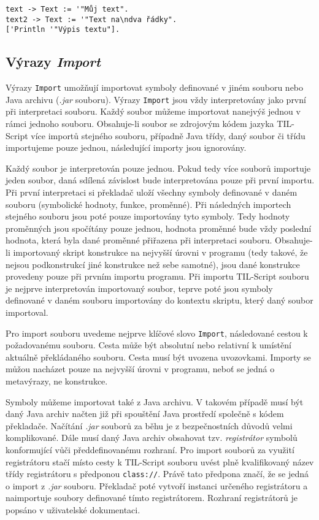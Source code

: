 \begin{lstlisting}[caption={Příklad využití typu Text}]
text -> Text := '"Můj text".
text2 -> Text := '"Text na\ndva řádky".
['Println '"Výpis textu"].
\end{lstlisting}

\subsection{Výrazy \textit{Import}}\label{import-statement}

Výrazy \lstinline{Import} umožňují importovat symboly definované v jiném souboru nebo Java archivu
(\textit{.jar} souboru). Výrazy \lstinline{Import} jsou vždy interpretovány jako první při
interpretaci souboru. Každý soubor můžeme importovat nanejvýš jednou v rámci jednoho souboru.
Obsahuje-li soubor se zdrojovým kódem jazyka TIL-Script více importů stejného souboru, případně Java
třídy, daný soubor či třídu importujeme pouze jednou, následující importy jsou ignorovány.

Každý soubor je interpretován pouze jednou. Pokud tedy více souborů importuje jeden soubor, daná
sdílená závislost bude interpretována pouze při první importu. Při první interpretaci si překladač
uloží všechny symboly definované v daném souboru (symbolické hodnoty, funkce, proměnné).
Při následných importech stejného souboru jsou poté pouze importovány tyto symboly. Tedy hodnoty
proměnných jsou spočítány pouze jednou, hodnota proměnné bude vždy poslední hodnota, která byla
dané proměnné přiřazena při interpretaci souboru. Obsahuje-li importovaný skript konstrukce
na nejvyšší úrovni v programu (tedy takové, že nejsou podkonstrukcí jiné konstrukce než sebe
samotné), jsou dané konstrukce provedeny pouze při prvním importu programu. Při importu TIL-Script
souboru je nejprve interpretován importovaný soubor, teprve poté jsou symboly definované v daném
souboru importovány do kontextu skriptu, který daný soubor importoval.

Pro import souboru uvedeme nejprve klíčové slovo \lstinline{Import}, následované cestou
k požadovanému souboru. Cesta může být absolutní nebo relativní k umístění aktuálně překládaného
souboru. Cesta musí být uvozena uvozovkami. Importy se můžou nacházet pouze na nejvyšší úrovni
v programu, neboť se jedná o metavýrazy, ne konstrukce.

Symboly můžeme importovat také z Java archivu. V takovém případě musí být daný Java archiv načten
již při spouštění Java prostředí společně s kódem překladače. Načítání \textit{.jar} souborů
za běhu je z bezpečnostních důvodů velmi komplikované. Dále musí daný Java archiv obsahovat tzv.
\textit{registrátor} symbolů konformující vůči předdefinovanému rozhraní. Pro import souborů
za využití registrátoru stačí místo cesty k TIL-Script souboru uvést plně kvalifikovaný název
třídy registrátoru s předponou \lstinline{class://}. Právě tato předpona značí, že se jedná o
import z \textit{.jar} souboru. Překladač poté vytvoří instanci určeného registrátoru a naimportuje
soubory definované tímto registrátorem. Rozhraní registrátorů je popsáno v uživatelské dokumentaci.

